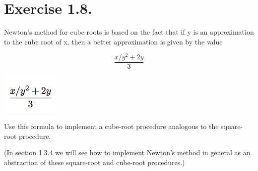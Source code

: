 \documentclass[11pt]{article}
\begin{document}
\section{Exercise 1.8.}
\label{sec-8}


  Newton's method for cube roots is based on the fact that if y is an
  approximation to the cube root of x, then a better approximation is
  given by the value

\begin{equation}
\frac{x/y^2 + 2y}{3}
\end{equation}

\includegraphics[width=.9\linewidth]{exercise-1.8.png}


  Use this formula to implement a cube-root procedure analogous to the
  square-root procedure.

  (In section 1.3.4 we will see how to implement
  Newton's method in general as an abstraction of these square-root and
  cube-root procedures.)
\end{document}
